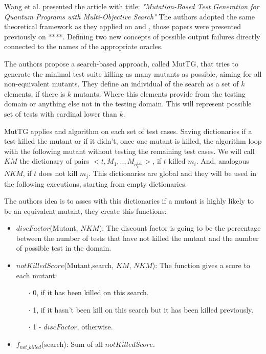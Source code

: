 \begin{itemize}
Wang et al. presented the article with title: \textit{"Mutation-Based Test Generation for Quantum Programs with Multi-Objective Search"}\cite{wang2022mutation} The authors adopted the same theoretical framework as they applied on \cite{ali2021assessing} and \cite{wang2021quito}, those papers were presented previously on ****. Defining two new concepts of possible output failures directly connected to the names of the appropriate oracles.\newline

The authors propose a search-based approach, called MutTG, that tries to generate the minimal test suite killing as many mutants as possible, aiming for all non-equivalent mutants. They define an individual of the search as a set of $k$ elements, if there is $k$ mutants. Where this elements provide from the testing domain or anything else not in the testing domain. This will represent possible set of tests with cardinal lower than $k$.\newline

MutTG applies and algorithm on each set of test cases. Saving dictionaries if a test killed the mutant or if it didn't, once one mutant is killed, the algorithm loop with the following mutant without testing the remaining test cases. We will call $KM$ the dictionary of pairs $<t,{M_{1},..,M_{n_{t}^{kill}}}>$, if $t$ killed $m_{i}$. And, analogous $NKM$, if $t$ does not kill $m_{j}$. This dictionaries are global and they will be used in the following executions, starting from empty dictionaries.\newline

The authors idea is to asses with this dictionaries if a mutant is highly likely to be an equivalent mutant, they create this functions:
\begin{itemize}
    \item $discFactor$(Mutant, $NKM$): The discount factor is going to be the percentage between the number of tests that have not killed the mutant and the number of possible test in the domain.
    \item $notKilledScore$(Mutant,search, $KM$, $NKM$): The function gives a score to each mutant:
        \begin{itemize}
            \item[$\cdot$] 0, if it has been killed on this search.
            \item[$\cdot$] 1, if it hasn't been kill on this search but it has been killed previously.
            \item[$\cdot$] 1 - $discFactor$, otherwise.
        \end{itemize}
    \item $f_{not\_killed}$(search): Sum of all $notKilledScore$.
\end{itemize}


\end{itemize}
